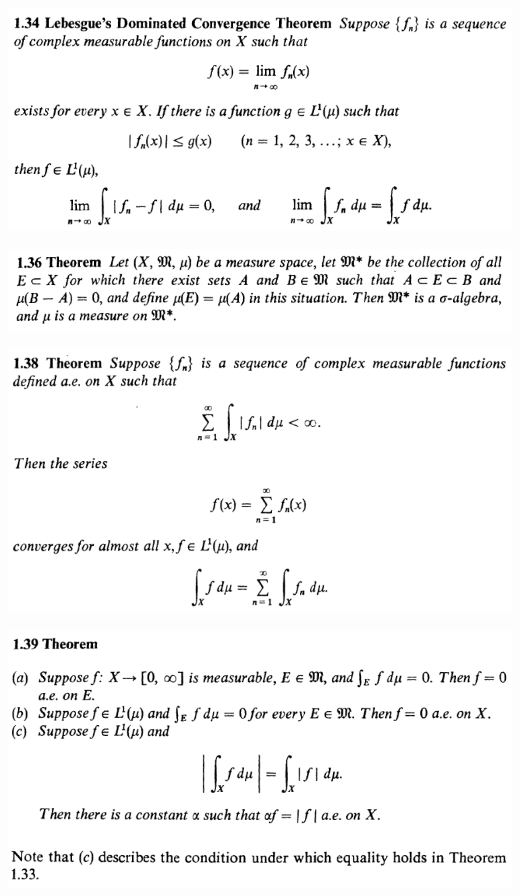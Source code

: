 \documentclass[12pt]{article}
\begin{document}
		\begin{center}
		\includegraphics{1ponto34}
		\end{center}

		\begin{center}
		\includegraphics{1ponto36}
		\end{center}

		\begin{center}
		\includegraphics{1ponto38}
		\end{center}

		\begin{center}
		\includegraphics{1ponto39}
		\end{center}
\end{document}
